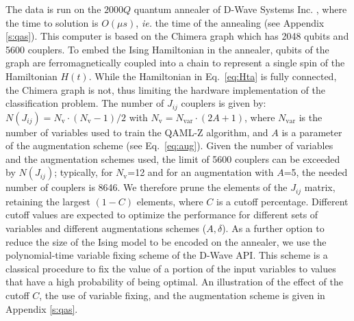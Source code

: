 \documentclass{article}
\begin{document}
The data is run on the $2000Q$ quantum annealer of D-Wave Systems Inc. 
\cite{dwave}, where the time to solution is $O(\mu s)$, 
\emph{ie.} the time of the annealing (see Appendix \ref{s:qas}). This 
computer is based on the Chimera graph which has 2048 qubits and 5600 
couplers. To embed the Ising Hamiltonian in the annealer, qubits of the 
graph are ferromagnetically coupled into a chain to represent a single 
spin of the Hamiltonian $H(t)$. While the Hamiltonian in Eq.~\ref{eq:Hta} 
is fully connected, the Chimera graph is not, thus limiting the hardware 
implementation of the classification problem. The number of $J_{ij}$ 
couplers is given by: $N(J_{ij})=N_{\mathrm{v}}\cdot(N_{\mathrm{v}}-1)/2$ 
with $N_{\mathrm{v}}=N_{\mathrm{var}}\cdot(2A+1)$, where 
$N_{\mathrm{var}}$ is the number of variables used to train the QAML-Z 
algorithm, and $A$ is a parameter of the augmentation scheme (see 
Eq.~\ref{eq:aug}). Given the number of variables and the augmentation 
schemes used, the limit of 5600 couplers can be exceeded by $N(J_{ij})$; 
typically, for $N_{\mathrm{v}}$=12 and for an augmentation with $A$=5, the 
needed number of couplers is 8646. We therefore prune the elements of the 
$J_{ij}$ matrix, retaining the largest $(1-C)$ elements, where $C$ is a 
cutoff percentage. Different cutoff values are expected to optimize the 
performance for different sets of variables and different augmentations 
schemes ($A, \delta$). As a further option to reduce the size of the Ising 
model to be encoded on the annealer, we use the polynomial-time variable 
fixing scheme of the D-Wave API. This scheme is a classical procedure to 
fix the value of a portion of the input variables to values that have a 
high probability of being optimal. An illustration of the effect of the 
cutoff $C$, the use of variable fixing, and the augmentation scheme is 
given in Appendix \ref{s:qas}.
\end{document}
